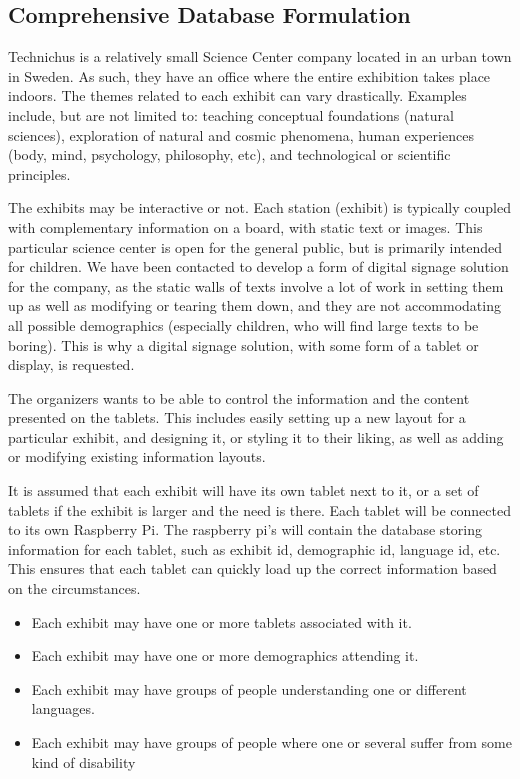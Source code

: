 \documentclass{exam}
\begin{document}
\begin{center}
\section*{Comprehensive Database Formulation}
\end{center}

Technichus is a relatively small Science Center company located in an urban town in Sweden. As such, they have an office where the entire exhibition takes place indoors. The themes related to each exhibit can vary drastically. Examples include, but are not limited to: teaching conceptual foundations (natural sciences), exploration of natural and cosmic phenomena, human experiences (body, mind, psychology, philosophy, etc), and technological or scientific principles.\\
\bigskip

The exhibits may be interactive or not. Each station (exhibit) is typically coupled with complementary information on a board, with static text or images. This particular science center is open for the general public, but is primarily intended for children. We have been contacted to develop a form of digital signage solution for the company, as the static walls of texts involve a lot of work in setting them up as well as modifying or tearing them down, and they are not accommodating all possible demographics (especially children, who will find large texts to be boring). This is why a digital signage solution, with some form of a tablet or display, is requested.\\
\bigskip

The organizers wants to be able to control the information and the content presented on the tablets. This includes easily setting up a new layout for a particular exhibit, and designing it, or styling it to their liking, as well as adding or modifying existing information layouts.\\
\bigskip

It is assumed that each exhibit will have its own tablet next to it, or a set of tablets if the exhibit is larger and the need is there. Each tablet will be connected to its own Raspberry Pi. The raspberry pi's will contain the database storing information for each tablet, such as exhibit id, demographic id, language id, etc. This ensures that each tablet can quickly load up the correct information based on the circumstances.\\
\bigskip

\begin{itemize}
\item Each exhibit may have one or more tablets associated with it.
\item Each exhibit may have one or more demographics attending it.
\item Each exhibit may have groups of people understanding one or different languages.
\item Each exhibit may have groups of people where one or several suffer from some kind of disability
\end{itemize}
\bigskip
\end{document}
